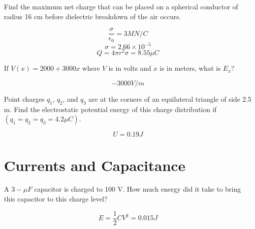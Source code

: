 \begin{questions}

  \question[3] Find the maximum net charge that can be placed on a
  spherical conductor of radius 16 cm before dielectric breakdown of
  the air occurs.

  \begin{solution}
    $$\frac{\sigma}{\epsilon_0} = 3 MN/C$$
    $$\sigma = 2.66 \times 10^{-5}$$
    $$Q = 4\pi r^2 \sigma = 8.55 \mu C$$
  \end{solution}

  \question[2] If $V(x) = 2000 + 3000x$ where $V$ is in volts and $x$
  is in meters, what is $E_x$?

  \begin{solution}
    $$-3000 V/m$$
  \end{solution}

  \question[2] Point charges $q_1$, $q_2$, and $q_3$ are at the
  corners of an equilateral triangle of side 2.5 m. Find the
  electrostatic potential energy of this charge distribution if $(q_1
  = q_2 = q_3 = 4.2 \mu C)$. 

  \begin{solution}
    $$U = 0.19 J$$
  \end{solution}

  \section{Currents and Capacitance}

  
  \question[3] A $3-\mu F$ capacitor is charged to 100 V. How much
  energy did it take to bring this capacitor to this charge level?

  \begin{solution}
    $$E = \frac{1}{2}C V^2 = 0.015 J$$
  \end{solution}

  
    

\end{questions}


